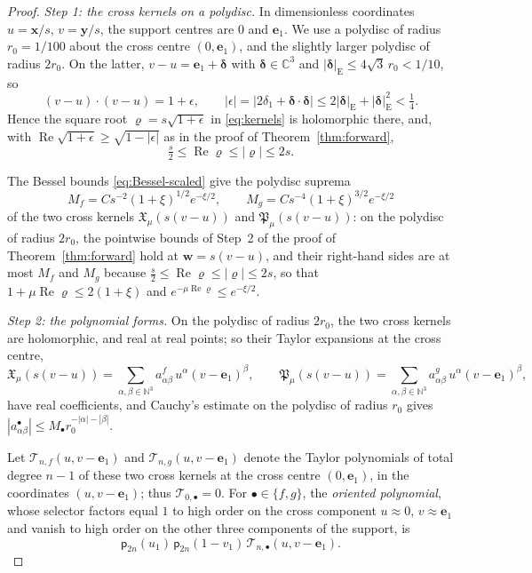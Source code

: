 \documentclass[11pt]{amsart}
\numberwithin{equation}{section}
\theoremstyle{definition}
\newcommand{\C}{\mathbb C}
\newcommand{\N}{\mathbb N}
\newcommand{\bx}{\mathbf x}
\newcommand{\by}{\mathbf y}
\newcommand{\eone}{\mathbf e_1}
\newcommand{\Rea}{\operatorname{Re}}
\begin{document}
\begin{proof}
\emph{Step 1: the cross kernels on a polydisc.} In dimensionless
coordinates \(u=\bx/s\), \(v=\by/s\), the support centres are \(0\)
and \(\eone\). We use a polydisc of radius \(r_0=1/100\) about the
cross centre \((0,\eone)\), and the slightly larger polydisc of radius
\(2r_0\). On the latter, \(v-u=\eone+\boldsymbol\delta\) with
\(\boldsymbol\delta\in\C^3\) and
\(|\boldsymbol\delta|_{\mathrm E}\le4\sqrt3\,r_0<1/10\), so
\[
 (v-u)\cdot(v-u)=1+\epsilon,\qquad
 |\epsilon|=|2\delta_1+\boldsymbol\delta\cdot\boldsymbol\delta|
 \le2|\boldsymbol\delta|_{\mathrm E}+|\boldsymbol\delta|_{\mathrm E}^2
 <\tfrac14 .
\]
Hence the square root \(\varrho=s\sqrt{1+\epsilon}\) in
\eqref{eq:kernels} is holomorphic there, and, with
\(\Rea\sqrt{1+\epsilon}\ge\sqrt{1-|\epsilon|}\) as in the proof of
Theorem~\ref{thm:forward},
\[
 \tfrac s2\le\Rea\varrho\le|\varrho|\le2s .
\]

The Bessel bounds \eqref{eq:Bessel-scaled} give the polydisc suprema
\[
 M_f=Cs^{-2}(1+\xi)^{1/2}e^{-\xi/2},\qquad
 M_g=Cs^{-4}(1+\xi)^{3/2}e^{-\xi/2}
\]
of the two cross kernels \(\mathfrak X_\mu(s(v-u))\) and
\(\mathfrak P_\mu(s(v-u))\): on the polydisc of radius \(2r_0\), the
pointwise bounds of Step~2 of the proof of Theorem~\ref{thm:forward}
hold at \(\mathbf w=s(v-u)\), and their right-hand sides are at most
\(M_f\) and \(M_g\) because \(\tfrac s2\le\Rea\varrho\le|\varrho|\le2s\),
so that \(1+\mu\Rea\varrho\le2(1+\xi)\) and
\(e^{-\mu\Rea\varrho}\le e^{-\xi/2}\).

\smallskip
\emph{Step 2: the polynomial forms.} On the polydisc of radius
\(2r_0\), the two cross kernels are holomorphic, and real at real
points; so their Taylor expansions at the cross centre,
\[
 \mathfrak X_\mu(s(v-u))
 =\sum_{\alpha,\beta\in\N^3}a^f_{\alpha\beta}\,u^\alpha(v-\eone)^\beta,
 \qquad
 \mathfrak P_\mu(s(v-u))
 =\sum_{\alpha,\beta\in\N^3}a^g_{\alpha\beta}\,u^\alpha(v-\eone)^\beta,
\]
have real coefficients, and Cauchy's estimate on the polydisc of
radius \(r_0\) gives
\(|a^\bullet_{\alpha\beta}|\le M_\bullet r_0^{-|\alpha|-|\beta|}\).

Let \(\mathcal T_{n,f}(u,v-\eone)\) and \(\mathcal T_{n,g}(u,v-\eone)\)
denote the Taylor polynomials of total degree \(n-1\) of these two
cross kernels at the cross centre \((0,\eone)\), in the coordinates
\((u,v-\eone)\); thus \(\mathcal T_{0,\bullet}=0\). For
\(\bullet\in\{f,g\}\), the
\emph{oriented polynomial}, whose selector factors equal \(1\) to high
order on the cross component \(u\approx0\), \(v\approx\eone\) and
vanish to high order on the other three components of the support, is
\[
 \mathsf p_{2n}(u_1)\,
 \mathsf p_{2n}(1-v_1)\,
 \mathcal T_{n,\bullet}(u,v-\eone).
\]


\end{proof}
\end{document}
